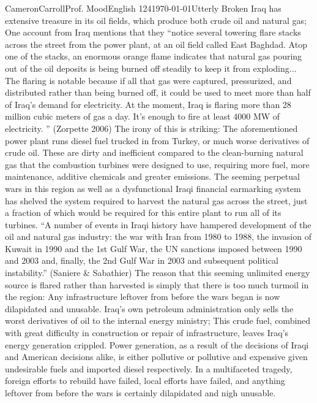 \begin{mla}{Cameron}{Carroll}{Prof. Mood}{English 124}{\today}{Utterly Broken}
 Iraq has extensive treasure in its oil fields, which produce both crude oil and natural gas; One account from Iraq mentions that they ``notice several towering flare stacks across the street from the power plant, at an oil field called East Baghdad. Atop one of the stacks, an enormous orange flame indicates that natural gas pouring out of the oil deposits is being burned off steadily to keep it from exploding... The flaring is notable because if all that gas were captured, pressurized, and distributed rather than being burned off, it could be used to meet more than half of Iraq's demand for electricity. At the moment, Iraq is flaring more than 28 million cubic meters of gas a day. It's enough to fire at least 4000 MW of electricity. '' (Zorpette 2006) The irony of this is striking: The aforementioned power plant runs diesel fuel trucked in from Turkey, or much worse derivatives of crude oil. These are dirty and inefficient compared to the clean-burning natural gas that the combustion turbines were designed to use, requiring more fuel, more maintenance, additive chemicals and greater emissions. The seeming perpetual wars in this region as well as a dysfunctional Iraqi financial earmarking system has shelved the system required to harvest the natural gas across the street, just a fraction of which would be required for this entire plant to run all of its turbines. ``A number of events in Iraqi history have hampered
development of the oil and natural gas industry: the war with Iran from 1980 to 1988, the invasion of Kuwait in 1990 and the 1st Gulf War, the UN sanctions imposed between 1990 and 2003 and, finally, the 2nd Gulf War in 2003 and subsequent political instability.'' (Saniere \& Sabathier) The reason that this seeming unlimited energy source is flared rather than harvested is simply that there is too much turmoil in the region: Any infrastructure leftover from before the wars began is now dilapidated and unusable. Iraq's own petroleum administration only sells the worst derivatives of oil to the internal energy ministry; This crude fuel, combined with great difficulty in construction or repair of infrastructure, leaves Iraq's energy generation crippled. Power generation, as a result of the decisions of Iraqi and American decisions alike, is either pollutive or pollutive and expensive given undesirable fuels and imported diesel respectively. In a multifaceted tragedy, foreign efforts to rebuild have failed, local efforts have failed, and anything leftover from before the wars is certainly dilapidated and nigh unusable.


\end{mla}
